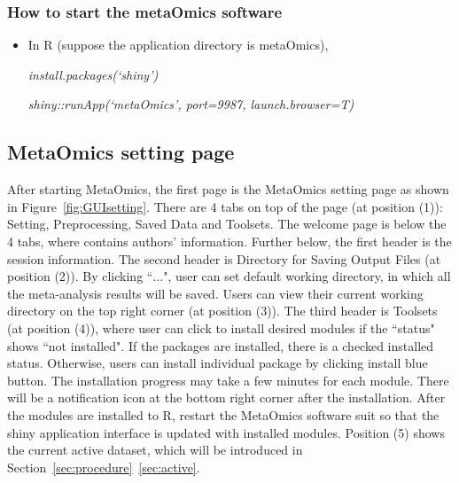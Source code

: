 \subsubsection{How to start the metaOmics software}
\begin{itemize}
\item In R (suppose the application directory is metaOmics),

\textit{install.packages(`shiny')}

\textit{shiny::runApp(`metaOmics', port=9987, launch.browser=T)}
\end{itemize}

\subsection{MetaOmics setting page}
\label{sec:setting}
After starting MetaOmics, 
the first page is the MetaOmics setting page as shown in Figure~\ref{fig:GUIsetting}.  
There are 4 tabs on top of the page (at position {\color{red} (1)}): Setting, Preprocessing, Saved Data and Toolsets.
The welcome page is below the 4 tabs, where contains authors' information.
Further below, the first header is the session information.
The second header is Directory for Saving Output Files (at position {\color{red} (2)}).
By clicking ``$\ldots$",
user can set default working directory, in which all the meta-analysis results will be saved.
Users can view their current working directory on the top right corner (at position {\color{red} (3)}).
The third header is Toolsets (at position {\color{red} (4)}),
where user can click to install desired modules if the ``status" shows ``not installed".
If the packages are installed, there is a checked installed status.
Otherwise, users can install individual package by clicking install blue button.
The installation progress may take a few minutes for each module.
There will be a notification icon at the bottom right corner after the installation. 
After the modules are installed to R, restart the MetaOmics software suit so that the shiny application interface is updated with installed modules.
Position {\color{red} (5)} shows the current active dataset, which will be introduced in Section~\ref{sec:procedure}~\ref{sec:active}. 
 
